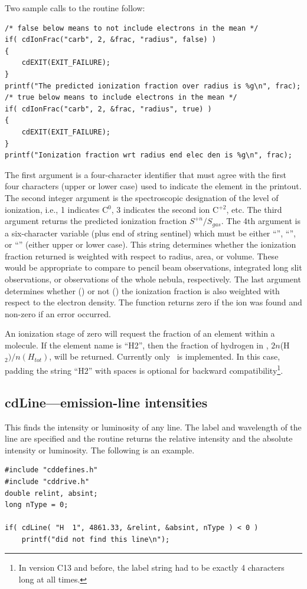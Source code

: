 Two sample calls to the routine follow:
\begin{verbatim}
/* false below means to not include electrons in the mean */
if( cdIonFrac("carb", 2, &frac, "radius", false) )
{
    cdEXIT(EXIT_FAILURE);
}
printf("The predicted ionization fraction over radius is %g\n", frac);
/* true below means to include electrons in the mean */
if( cdIonFrac("carb", 2, &frac, "radius", true) )
{
    cdEXIT(EXIT_FAILURE);
}
printf("Ionization fraction wrt radius end elec den is %g\n", frac);
\end{verbatim}
The first argument is a four-character identifier that must agree with the
first four characters (upper or lower case) used to indicate the element
in the printout.  The second integer argument is the spectroscopic
designation of the level of ionization, i.e., 1 indicates C$^0$,
3 indicates the second ion C$^{+2}$, etc.
The third argument returns the predicted ionization
fraction $S^{+n}/S_{gas}$.
The 4th argument is a six-character variable (plus end
of string sentinel) which must be either ``'', ``'', or
``'' (either
upper or lower case).
This string determines whether the ionization fraction
returned is weighted with respect to radius, area, or volume.
These would be appropriate to compare to pencil beam observations,
integrated long slit observations, or observations of the whole nebula, respectively.
The last argument
determines whether () or not ()
the ionization fraction is also
weighted with respect to the electron density.
The function returns zero
if the ion was found and non-zero if an error occurred.

An ionization stage of zero will request the fraction of an element
within a molecule.
If the element name is ``H2'', then the fraction of hydrogen in \htwo,
$2n$(H$_2)/n(H_{tot})$, will
be returned.  Currently only \htwo\ is implemented.
In this case, padding the
string ``H2'' with spaces is optional for backward compatibility\footnote{In
  version C13 and before, the label string had to be exactly 4 characters
  long at all times.}.

\subsection{cdLine---emission-line intensities }

This finds the intensity or luminosity of any line.  The label and
wavelength of the line are specified and the routine returns the relative
intensity and the absolute intensity or luminosity.
The following is an example.
\begin{verbatim}
#include "cddefines.h"
#include "cddrive.h"
double relint, absint;
long nType = 0;

if( cdLine( "H  1", 4861.33, &relint, &absint, nType ) < 0 )
    printf("did not find this line\n");
\end{verbatim}


